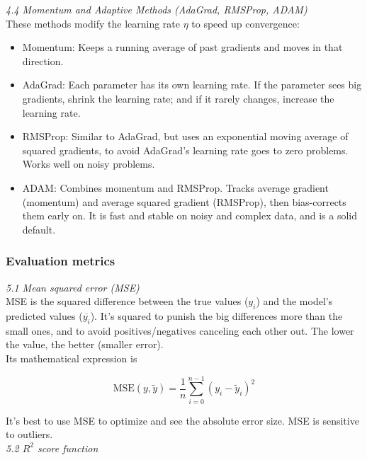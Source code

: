 \documentclass[amssymb,twocolumn,aps]{revtex4-2}
\begin{document}
\textit{4.4 Momentum and Adaptive Methods (AdaGrad, RMSProp, ADAM) } \\

These methods modify the learning rate $\eta$ to speed up convergence: 

\begin{itemize}
    \item Momentum: Keeps a running average of past gradients and moves in that direction. 
    \item AdaGrad: Each parameter has its own learning rate. If the parameter sees big gradients, shrink the learning rate; and if it rarely changes, increase the learning rate. 
    \item RMSProp: Similar to AdaGrad, but uses an exponential moving average of squared gradients, to avoid AdaGrad's learning rate goes to zero problems. Works well on noisy problems.
    \item ADAM: Combines momentum and RMSProp. Tracks average gradient (momentum) and average squared gradient (RMSProp), then bias-corrects them early on. It is fast and stable on noisy and complex data, and is a solid default.
\end{itemize}

\subsubsection{Evaluation metrics}
\label{subsubsec:eval_theory}

\textit{5.1 Mean squared error (MSE)} \\

MSE is the squared difference between the true values ($y_i$) and the model's predicted values ($\overline{y_i}$). It's squared to punish the big differences more than the small ones, and to avoid positives/negatives canceling each other out. The lower the value, the better (smaller error). \\

Its mathematical expression is 

\begin{equation}
    \text{MSE}(y, \tilde{y}) = \frac{1}{n} \sum_{i=0}^{n-1} (y_i - \tilde{y}_i)^2 
\end{equation}

It's best to use MSE to optimize and see the absolute error size. MSE is sensitive to outliers. \\

\textit{5.2 $R^2$ score function} \\
\end{document}

